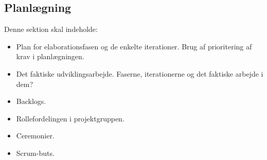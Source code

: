 \subsection{Planlægning}
Denne sektion skal indeholde:

\begin{itemize}
    \item Plan for elaborationsfasen og de enkelte iterationer. Brug af prioritering af krav i planlægningen.
    \item Det faktiske udviklingsarbejde. Faserne, iterationerne og det faktiske  arbejde i dem?
    \item Backlogs.
    \item Rollefordelingen i projektgruppen.
    \item Ceremonier.
    \item Scrum-buts.
\end{itemize}